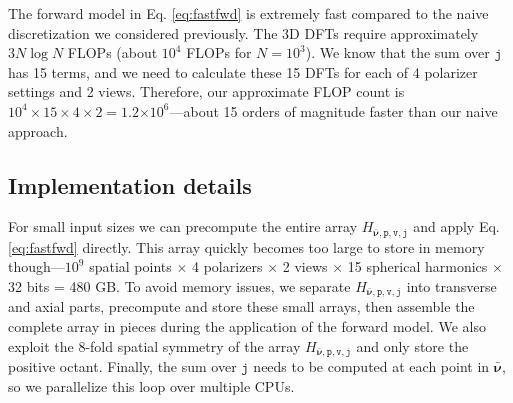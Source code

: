 \documentclass[11pt]{article}
\providecommand{\e}[1]{\ensuremath{\times 10^{#1}}}
\providecommand{\bs}[1]{\boldsymbol{#1}}
\providecommand{\ttt}[1]{\texttt{#1}}
\begin{document}
The forward model in Eq. \ref{eq:fastfwd} is extremely fast compared to the
naive discretization we considered previously. The 3D DFTs require approximately
$3N\log N$ FLOPs (about $10^4$ FLOPs for $N = 10^3$). We know that the sum over
$\ttt{j}$ has 15 terms, and we need to calculate these 15 DFTs for each of 4
polarizer settings and 2 views. Therefore, our approximate FLOP count is
$10^4 \times 15 \times 4 \times 2 = 1.2\e{6}$---about 15 orders of magnitude
faster than our naive approach.

\subsection{Implementation details}
For small input sizes we can precompute the entire array
$H_{\bar{\bs{\nu}},\ttt{p},\ttt{v},\ttt{j}}$ and apply Eq. \ref{eq:fastfwd}
directly. This array quickly becomes too large to store in memory
though---$10^9$ spatial points $\times$ 4 polarizers $\times$ 2 views $\times$
15 spherical harmonics $\times$ 32 bits = 480 GB. To avoid memory issues, we
separate $H_{\bar{\bs{\nu}},\ttt{p},\ttt{v},\ttt{j}}$ into transverse and axial
parts, precompute and store these small arrays, then assemble the complete array
in pieces during the application of the forward model. We also exploit the
8-fold spatial symmetry of the array
$H_{\bar{\bs{\nu}},\ttt{p},\ttt{v},\ttt{j}}$ and only store the positive octant.
Finally, the sum over $\ttt{j}$ needs to be computed at each point in
$\bar{\bs{\nu}}$, so we parallelize this loop over multiple CPUs.
\end{document}
